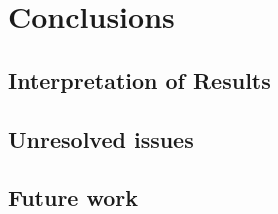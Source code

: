 \chapter{Conclusions}\label{ch:conclusions}

\section{Interpretation of Results}

\section{Unresolved issues} %

\section{Future work}

